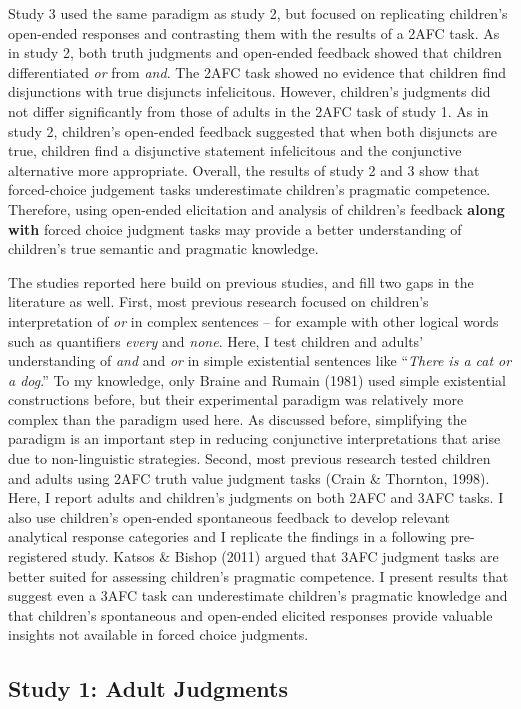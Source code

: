 \documentclass[man]{apa6}
\theoremstyle{definition}
\theoremstyle{definition}
\theoremstyle{definition}
\theoremstyle{remark}
\begin{document}
Study 3 used the same paradigm as study 2, but focused on replicating
children's open-ended responses and contrasting them with the results of
a 2AFC task. As in study 2, both truth judgments and open-ended feedback
showed that children differentiated \emph{or} from \emph{and}. The 2AFC
task showed no evidence that children find disjunctions with true
disjuncts infelicitous. However, children's judgments did not differ
significantly from those of adults in the 2AFC task of study 1. As in
study 2, children's open-ended feedback suggested that when both
disjuncts are true, children find a disjunctive statement infelicitous
and the conjunctive alternative more appropriate. Overall, the results
of study 2 and 3 show that forced-choice judgement tasks underestimate
children's pragmatic competence. Therefore, using open-ended elicitation
and analysis of children's feedback \textbf{along with} forced choice
judgment tasks may provide a better understanding of children's true
semantic and pragmatic knowledge.

The studies reported here build on previous studies, and fill two gaps
in the literature as well. First, most previous research focused on
children's interpretation of \emph{or} in complex sentences -- for
example with other logical words such as quantifiers \emph{every} and
\emph{none}. Here, I test children and adults' understanding of
\emph{and} and \emph{or} in simple existential sentences like
\enquote{\emph{There is a cat or a dog}.} To my knowledge, only Braine
and Rumain (1981) used simple existential constructions before, but
their experimental paradigm was relatively more complex than the
paradigm used here. As discussed before, simplifying the paradigm is an
important step in reducing conjunctive interpretations that arise due to
non-linguistic strategies. Second, most previous research tested
children and adults using 2AFC truth value judgment tasks (Crain \&
Thornton, 1998). Here, I report adults and children's judgments on both
2AFC and 3AFC tasks. I also use children's open-ended spontaneous
feedback to develop relevant analytical response categories and I
replicate the findings in a following pre-registered study. Katsos \&
Bishop (2011) argued that 3AFC judgment tasks are better suited for
assessing children's pragmatic competence. I present results that
suggest even a 3AFC task can underestimate children's pragmatic
knowledge and that children's spontaneous and open-ended elicited
responses provide valuable insights not available in forced choice
judgments.

\subsection{Study 1: Adult Judgments}\label{study-1-adult-judgments}
\end{document}
